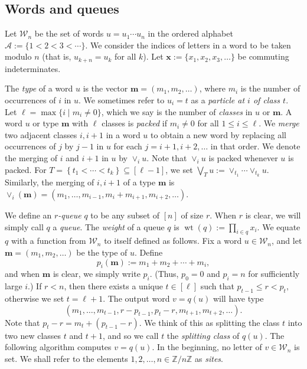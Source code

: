 \documentclass[reqno]{amsart}
\newcommand{\0}{\phantom{c}}
\newcommand{\merge}[1]{\vee_{#1}} %
\DeclareMathOperator{\wt}{wt} %
\newcommand{\xx}{\mathbf{x}}
\newcommand{\mm}{\mathbf{m}}
\newcommand{\mcA}{\mathcal{A}}
\newcommand{\mcW}{\mathcal{W}}
\newcommand{\ZZ}{\mathbb{Z}}
\let\prodnonlimits\prod
\renewcommand{\prod}{\prodnonlimits\limits}
\newcommand{\set}[1]{\left\{ #1 \right\}}
\newcommand{\ive}[1]{\left[ #1 \right]}
\newcommand{\defn}[1]{{\color{darkred}\emph{#1}}} %
\theoremstyle{plain}
\theoremstyle{definition}
\numberwithin{equation}{section}
\begin{document}
\subsection{Words and queues}

Let $\mcW_n$ be the set of words $u = u_1 \dotsm u_n$ in the ordered alphabet $\mcA := \{1 < 2 < 3 < \cdots \}$.
We consider the indices of letters in a word to be taken modulo $n$ (that is, $u_{k+n} = u_k$ for all $k$).
Let $\xx := \{x_1, x_2, x_3, \ldots\}$ be commuting indeterminates.

The \defn{type} of a word $u$ is the vector $\mm = (m_1, m_2, \ldots)$, where $m_i$ is the number of occurrences of $i$ in $u$.
We sometimes refer to $u_i = t$ as a \defn{particle at $i$ of class $t$}.
Let $\ell = \max\{i \mid m_i \neq 0 \}$, which we say is the number of \defn{classes} in $u$ or $\mm$.
A word $u$ or type $\mm$ with $\ell$ classes is \defn{packed} if $m_i \neq 0$ for all $1 \leq i \leq \ell$.
We \defn{merge} two adjacent classes $i,i+1$ in a word $u$ to obtain a new word by replacing all occurrences of $j$ by $j-1$ in $u$ for each $j = i+1, i+2, \ldots$ in that order.
We denote the merging of $i$ and $i+1$ in $u$ by $\merge{i} u$.
Note that $\merge{i} u$ is packed whenever $u$ is packed.
For $T = \set{t_1 < \cdots < t_k} \subseteq \ive{\ell-1}$, we set $\bigvee_T u := \merge{t_1} \cdots \merge{t_k} u$.
Similarly, the merging of $i,i+1$ of a type $\mm$ is $\merge{i}(\mm) = (m_1, \dotsc, m_{i-1}, m_i + m_{i+1}, m_{i+2}, \ldots)$.

We define an \defn{$r$-queue} $q$ to be any subset of $\ive{n}$ of size $r$. When $r$ is clear, we will simply call $q$ a \defn{queue}.
The \defn{weight} of a queue $q$ is $\wt(q) := \prod_{i \in q} x_i$.
We equate $q$ with a function from $\mcW_n$ to itself defined as follows.
Fix a word $u \in \mcW_n$, and let $\mm = (m_1, m_2, \ldots)$ be the type of $u$.
Define
\begin{equation}
\label{eq:type_partial_sums}
p_i(\mm) := m_1 + m_2 + \cdots + m_i,
\end{equation}
and when $\mm$ is clear, we simply write $p_i$.
(Thus, $p_0 = 0$ and $p_i = n$ for sufficiently large $i$.)
If $r < n$, then there exists a unique $t \in \ive{\ell}$ such that
$
p_{t-1} \leq r < p_t,
$
otherwise we set $t = \ell + 1$.
The output word $v = q(u)$ will have type
\[
(m_1, \dots, m_{t-1}, r-p_{t-1}, p_{t}-r, m_{t+1}, m_{t+2}, \ldots).
\]
Note that $p_{t} - r = m_{t} + (p_{t-1} - r)$.
We think of this as splitting the class $t$ into two new classes $t$ and $t+1$, and so we call $t$ the \defn{splitting class} of $q(u)$.
The following algorithm computes $v = q(u)$.
In the beginning, no letter of $v \in \mcW_n$ is set.
We shall refer to the elements $1, 2, \ldots, n \in \ZZ / n \ZZ$ as \defn{sites}.
\end{document}
